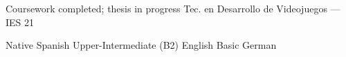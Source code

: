
\begin{cventries}
  \cventry
    {Coursework completed; thesis in progress}
    {Tec. en Desarrollo de Videojuegos — IES 21}
    {}
    {}
    {}
\end{cventries}


\begin{cventries}
  \cventry
    {Native}
    {Spanish}
    {}
    {}
    {}
  \cventry
    {Upper-Intermediate (B2)}
    {English}
    {}
    {}
    {}
  \cventry
    {Basic}
    {German}
    {}
    {}
    {}
\end{cventries}
